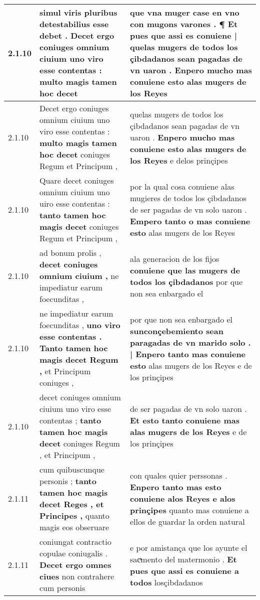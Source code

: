\begin{tabular}{|p{1cm}|p{6.5cm}|p{6.5cm}|}
2.1.10 & simul viris pluribus detestabilius esse debet . \textbf{ Decet ergo coniuges omnium ciuium uno viro esse contentas : } multo magis tamen hoc decet & que vna muger case en vno con mugons varones . \textbf{ ¶ Et pues que assi es conuiene | quelas mugers de todos los çibdadanos sean pagadas de vn uaron . } Enpero mucho mas conuiene esto alas mugers de los Reyes \\\hline
2.1.10 & Decet ergo coniuges omnium ciuium uno viro esse contentas : \textbf{ multo magis tamen hoc decet } coniuges Regum et Principum , & quelas mugers de todos los çibdadanos sean pagadas de vn uaron . \textbf{ Enpero mucho mas conuiene esto alas mugers de los Reyes } e delos prinçipes \\\hline
2.1.10 & Quare decet coniuges omnium ciuium uno uiro esse contentas : \textbf{ tanto tamen hoc magis decet } coniuges Regum et Principum , & por la qual cosa conuiene alas mugieres de todos los çibdadanos de ser pagadas de vn solo uaron . \textbf{ Empero tanto o mas conuiene esto } alas mugers de los Reyes \\\hline
2.1.10 & ad bonum prolis , \textbf{ decet coniuges omnium ciuium , } ne impediatur earum foecunditas , & ala generacion de los fijos \textbf{ conuiene que las mugers de todos los çibdadanos } por que non sea enbargado el \\\hline
2.1.10 & ne impediatur earum foecunditas , \textbf{ uno viro esse contentas . Tanto tamen hoc magis decet Regum , } et Principum coniuges , & por que non sea enbargado el \textbf{ sunconçebemiento sean paragadas de vn marido solo . | Enpero tanto mas conuiene esto } alas mugers de los Reyes e de los prinçipes \\\hline
2.1.10 & decet coniuges omnium ciuium uno viro esse contentas ; \textbf{ tanto tamen hoc magis decet } coniuges Regum , et Principum , & de ser pagadas de vn solo uaron . \textbf{ Et esto tanto conuiene mas alas mugers de los Reyes } e de los prinçipes \\\hline
2.1.11 & cum quibuscunque personis ; \textbf{ tanto tamen hoc magis decet Reges , et Principes , } quanto magis eos obseruare & con quales quier perssonas . \textbf{ Enpero tanto mas esto conuiene alos Reyes e alos prinçipes } quanto mas conuiene a ellos de guardar la orden natural \\\hline
2.1.11 & coniungat contractio copulae coniugalis . \textbf{ Decet ergo omnes ciues } non contrahere cum personis & e por amistança que los ayunte el sacͣmento del matermonio . \textbf{ Et pues que assi es conuiene a todos } losçibdadanos \\\hline

\end{tabular}
